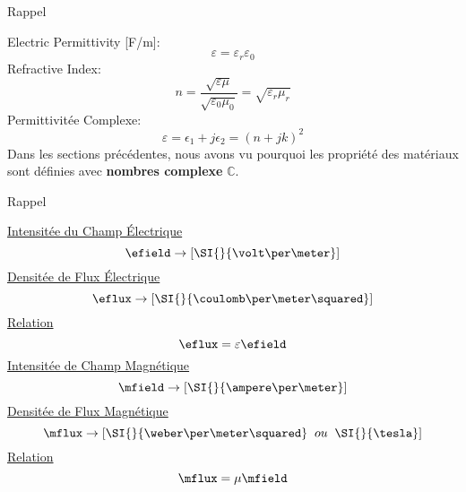 \begin{frame}{Rappel}
    \begin{twocolumns}[0.4]
        \leftcol
            Electric Permittivity [F/m]:
            \begin{equation*}
                \varepsilon =\varepsilon_r \varepsilon_0
            \end{equation*}
            Refractive Index:
            \begin{equation*}
                n =\frac{\sqrt{\varepsilon \mu}}{\sqrt{\varepsilon_0 \mu_0}} = \sqrt{\varepsilon_r \mu_r}
            \end{equation*}
            Permittivitée Complexe:
            \begin{equation*}
                \varepsilon = \epsilon_1 + j \epsilon_2 = (n+jk)^2
            \end{equation*}
        \rightcol
            Dans les sections précédentes, nous avons vu pourquoi les propriété des matériaux sont définies avec \textbf{nombres complexe} $\mathbb{C}$.
    \end{twocolumns}
\end{frame}

\begin{frame}{Rappel}
    \centering
    \begin{twocolumns}[0.4]
        \leftcol
            \centering
            \underline{Intensitée du Champ Électrique}
            \begin{equation*}
                \efield \rightarrow [\SI{}{\volt\per\meter}]
            \end{equation*}
            \underline{Densitée de Flux Électrique}
            \begin{equation*}
                \eflux \rightarrow [\SI{}{\coulomb\per\meter\squared}]
            \end{equation*}
            \underline{Relation}
            \begin{equation*}
                \eflux = \varepsilon \efield
            \end{equation*}
        \rightcol
            \centering
            \underline{Intensitée de Champ Magnétique}
            \begin{equation*}
                \mfield \rightarrow [\SI{}{\ampere\per\meter}]
            \end{equation*}
            \underline{Densitée de Flux Magnétique}
            \begin{equation*}
                \mflux \rightarrow [\SI{}{\weber\per\meter\squared} \;\; ou \;\; \SI{}{\tesla}]
            \end{equation*}
            \underline{Relation}
            \begin{equation*}
                \mflux = \mu \mfield
            \end{equation*}
    \end{twocolumns}
\end{frame}

